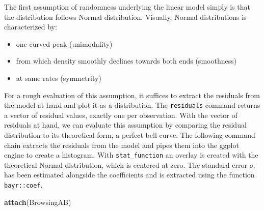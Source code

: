\documentclass[]{svmono}
\newenvironment{Shaded}{\begin{snugshade}}{\end{snugshade}}
\newcommand{\KeywordTok}[1]{\textcolor[rgb]{0.13,0.29,0.53}{\textbf{#1}}}
\newcommand{\DataTypeTok}[1]{\textcolor[rgb]{0.13,0.29,0.53}{#1}}
\newcommand{\DecValTok}[1]{\textcolor[rgb]{0.00,0.00,0.81}{#1}}
\newcommand{\StringTok}[1]{\textcolor[rgb]{0.31,0.60,0.02}{#1}}
\newcommand{\OperatorTok}[1]{\textcolor[rgb]{0.81,0.36,0.00}{\textbf{#1}}}
\newcommand{\NormalTok}[1]{#1}
\providecommand{\tightlist}{%
  \setlength{\itemsep}{0pt}\setlength{\parskip}{0pt}}
\theoremstyle{definition}
\theoremstyle{definition}
\theoremstyle{definition}
\theoremstyle{remark}
\begin{document}
The first assumption of randomness underlying the linear model simply is
that the distribution follows Normal distribution. Visually, Normal
distributions is characterized by:

\begin{itemize}
\tightlist
\item
  one curved peak (unimodality)
\item
  from which density smoothly declines towards both ends (smoothness)
\item
  at same rates (symmetrity)
\end{itemize}

For a rough evaluation of this assumption, it suffices to extract the
residuals from the model at hand and plot it as a distribution. The
\texttt{residuals} command returns a vector of residual values, exactly
one per observation. With the vector of residuals at hand, we can
evaluate this assumption by comparing the residual distribution to its
theoretical form, a perfect bell curve. The following command chain
extracts the residuals from the model and pipes them into the ggplot
engine to create a histogram. With \texttt{stat\_function} an overlay is
created with the theoretical Normal distribution, which is centered at
zero. The standard error \(\sigma_\epsilon\) has been estimated
alongside the coefficients and is extracted using the function
\texttt{bayr::coef}.

\begin{Shaded}
\begin{Highlighting}[]
\KeywordTok{attach}\NormalTok{(BrowsingAB)}
\end{Highlighting}
\end{Shaded}

\begin{Shaded}
\end{Shaded}
\end{document}
